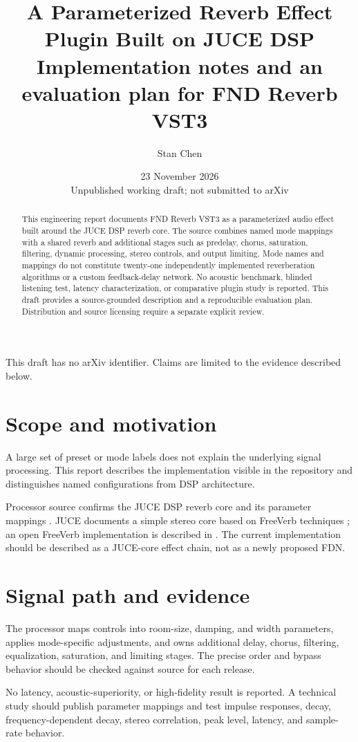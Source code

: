\documentclass[11pt]{article}
\title{A Parameterized Reverb Effect Plugin Built on JUCE DSP\\\large Implementation notes and an evaluation plan for FND Reverb VST3}
\author{Stan Chen}
\date{23 November 2026\\[4pt]\small Unpublished working draft; not submitted to arXiv}
\begin{document}
\maketitle
\begin{center}\small This draft has no arXiv identifier. Claims are limited to the evidence described below.\end{center}
\begin{abstract}
This engineering report documents FND Reverb VST3 as a parameterized audio effect built around the JUCE DSP reverb core. The source combines named mode mappings with a shared reverb and additional stages such as predelay, chorus, saturation, filtering, dynamic processing, stereo controls, and output limiting. Mode names and mappings do not constitute twenty-one independently implemented reverberation algorithms or a custom feedback-delay network. No acoustic benchmark, blinded listening test, latency characterization, or comparative plugin study is reported. This draft provides a source-grounded description and a reproducible evaluation plan. Distribution and source licensing require a separate explicit review.
\end{abstract}
\section{Scope and motivation}
A large set of preset or mode labels does not explain the underlying signal processing. This report describes the implementation visible in the repository and distinguishes named configurations from DSP architecture.\par
Processor source confirms the JUCE DSP reverb core and its parameter mappings \cite{r3}. JUCE documents a simple stereo core based on FreeVerb techniques \cite{r1}; an open FreeVerb implementation is described in \cite{r2}. The current implementation should be described as a JUCE-core effect chain, not as a newly proposed FDN.\par
\section{Signal path and evidence}
The processor maps controls into room-size, damping, and width parameters, applies mode-specific adjustments, and owns additional delay, chorus, filtering, equalization, saturation, and limiting stages. The precise order and bypass behavior should be checked against source for each release.\par
No latency, acoustic-superiority, or high-fidelity result is reported. A technical study should publish parameter mappings and test impulse responses, decay, frequency-dependent decay, stereo correlation, peak level, latency, and sample-rate behavior.\par
\end{document}
